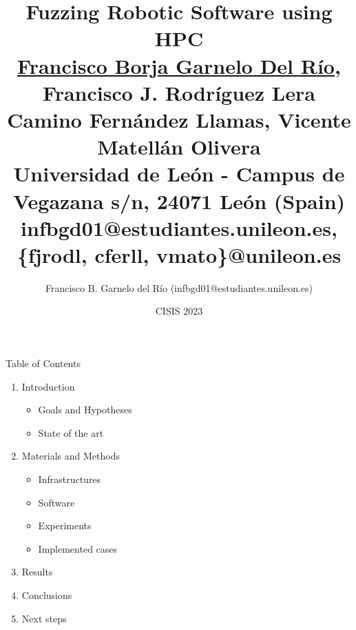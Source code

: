 \documentclass[aspectratio=169]{beamer}
\title[{\fz} robots HPC]{\textbf{Fuzzing Robotic Software using HPC}\\
\small{\underline{Francisco Borja Garnelo Del Río}, Francisco J. Rodríguez Lera } \\
\small{Camino Fernández Llamas, Vicente Matellán Olivera} \\
\tiny{Universidad de León - 
Campus de Vegazana s/n, 24071 León (Spain)} \\
\tiny{infbgd01@estudiantes.unileon.es, \{fjrodl, cferll, vmato\}@unileon.es}
}
\author{Francisco B. Garnelo del Río (infbgd01@estudiantes.unileon.es)}
\date{CISIS 2023}
\begin{document}

\titleframe

\begin{frame}{Table of Contents}

\begin{enumerate}
\item Introduction
\begin{itemize}
    \item Goals and Hypotheses
    \item State of the art
\end{itemize}
\item Materials and Methods
\begin{itemize}
    \item Infrastructures
    \item Software
    \item Experiments
    \item Implemented cases
\end{itemize}
\item Results
\item Conclusions
\item Next steps
\end{enumerate}
 \end{frame}


\end{document}
